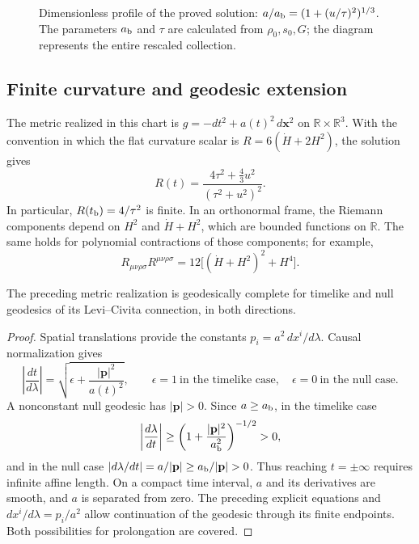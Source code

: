 \begin{figure}[htbp]
\centering
{}
\caption{Dimensionless profile of the proved solution:
\(a/a_{\rm b}=(1+(u/\tau)^2)^{1/3}\).
The parameters \(a_{\rm b}\) and \(\tau\) are calculated from
\(\rho_0,s_0,G\); the diagram represents the entire rescaled collection.}
\label{vii:fig:rebote-polvo}
\end{figure}

\subsection{Finite curvature and geodesic extension}
The metric realized in this chart is
\(g=-dt^2+a(t)^2\,d\mathbf x^2\) on
\(\mathbb R\times\mathbb R^3\). With the convention in which
the flat curvature scalar is \(R=6(\dot H+2H^2)\), the solution gives
\[
 R(t)=\frac{4\tau^2+\frac43u^2}{(\tau^2+u^2)^2}.
\]
In particular, \(R(t_{\rm b})=4/\tau^2\) is finite.
In an orthonormal frame, the Riemann components depend on
\(H^2\) and \(\dot H+H^2\), which are bounded functions on
\(\mathbb R\). The same holds for polynomial contractions
of those components; for example,
\[
 R_{\mu\nu\rho\sigma}R^{\mu\nu\rho\sigma}
 =12\bigl[(\dot H+H^2)^2+H^4\bigr].
\]

\begin{proposition}
\label{vii:prop:completitud-causal-polvo}
The preceding metric realization is geodesically complete
for timelike and null geodesics of its Levi--Civita
connection, in both directions.
\end{proposition}
\begin{proof}
Spatial translations provide the constants
\(p_i=a^2\,dx^i/d\lambda\). Causal normalization gives
\[
 \left|\frac{dt}{d\lambda}\right|
 =\sqrt{\epsilon+\frac{|\mathbf p|^2}{a(t)^2}},
 \qquad \epsilon=1\ \text{in the timelike case},\quad
 \epsilon=0\ \text{in the null case}.
\]
A nonconstant null geodesic has \(|\mathbf p|>0\).
Since \(a\geq a_{\rm b}\), in the timelike case
\[
 \left|\frac{d\lambda}{dt}\right|
 \geq\left(1+\frac{|\mathbf p|^2}{a_{\rm b}^2}\right)^{-1/2}>0,
\]
and in the null case
\(\left|d\lambda/dt\right|=a/|\mathbf p|
 \geq a_{\rm b}/|\mathbf p|>0\).
Thus reaching \(t=\pm\infty\) requires infinite affine length.
On a compact time interval, \(a\) and its derivatives are
smooth, and \(a\) is separated from zero. The preceding explicit
equations and \(dx^i/d\lambda=p_i/a^2\) allow continuation of
the geodesic through its finite endpoints. Both possibilities
for prolongation are covered.
\end{proof}

